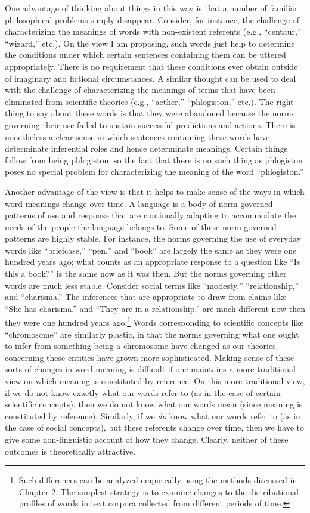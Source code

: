 One advantage of thinking about things in this way is that a number of familiar philosophical problems simply disappear. Consider, for instance, the challenge of characterizing the meanings of words with non-existent referents (e.g., ``centaur,'' ``wizard,'' etc.). On the view I am proposing, such words just help to determine the conditions under which certain sentences containing them can be uttered appropriately. There is no requirement that these conditions ever obtain outside of imaginary and fictional circumstances. A similar thought can be used to deal with the challenge of characterizing the meanings of terms that have been eliminated from scientific theories (e.g., ``aether,'' ``phlogiston,'' etc.). The right thing to say about these words is that they were abandoned because the norms governing their use failed to sustain successful predictions and actions. There is nonetheless a clear sense in which sentences containing these words have determinate inferential roles and hence determinate meanings. Certain things follow from being phlogiston, so the fact that there is no such thing as phlogiston poses no special problem for characterizing the meaning of the word ``phlogiston.''

Another advantage of the view is that it helps to make sense of the ways in which word meanings change over time. A language is a body of norm-governed patterns of use and response that are continually adapting to accommodate the needs of the people the language belongs to. Some of these norm-governed patterns are highly stable. For instance, the norms governing the use of everyday words like ``briefcase,'' ``pen,'' and ``book'' are largely the same as they were one hundred years ago; what counts as an appropriate response to a question like ``Is this a book?'' is the same now as it was then. But the norms governing other words are much less stable. Consider social terms like ``modesty,'' ``relationship,'' and ``charisma.'' The inferences that are appropriate to draw from claims like ``She has charisma.'' and ``They are in a relationship.'' are much different now then they were one hundred years ago.\footnote{Such differences can be analyzed empirically using the methods discussed in Chapter 2. The simplest strategy is to examine changes to the distributional profiles of words in text corpora collected from different periods of time.} Words corresponding to scientific concepts like ``chromosome'' are similarly plastic, in that the norms governing what one ought to infer from something being a chromosome have changed as our theories concerning these entities have grown more sophisticated. Making sense of these sorts of changes in word meaning is difficult if one maintains a more traditional view on which meaning is constituted by reference. On this more traditional view, if we do not know exactly what our words refer to (as in the case of certain scientific concepts), then we do not know what our words mean (since meaning is constituted by reference). Similarly, if we \textit{do} know what our words refer to (as in the case of social concepts), but these referents change over time, then we have to give some non-linguistic account of how they change. Clearly, neither of these outcomes is theoretically attractive.  

